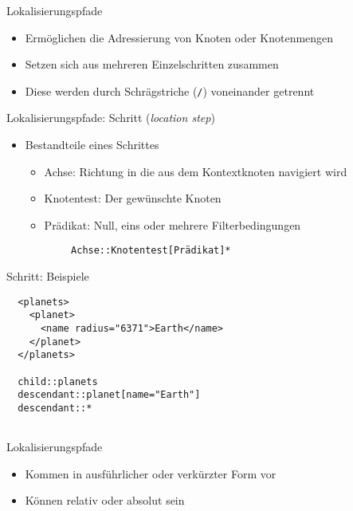 \documentclass{beamer}
\begin{document}
\begin{frame}{Lokalisierungspfade}
	
	\begin{itemize}
		\item Ermöglichen die Adressierung von Knoten oder Knotenmengen	
		\item Setzen sich aus mehreren Einzelschritten zusammen
		\item Diese werden durch Schrägstriche (\texttt{/}) voneinander getrennt
	\end{itemize}
	
\end{frame}

\begin{frame}[fragile]{Lokalisierungspfade: Schritt (\emph{location step})}
	
	\begin{itemize}
		\item Bestandteile eines Schrittes
		\begin{itemize}
			\item Achse: Richtung in die aus dem Kontextknoten navigiert wird
			\item Knotentest: Der gewünschte Knoten
			\item Prädikat: Null, eins oder mehrere Filterbedingungen
		\end{itemize}
		
		\vspace{1cm}
		\centering
		\begin{verbatim}
        Achse::Knotentest[Prädikat]*
		\end{verbatim}
	\end{itemize}
	
\end{frame}

\begin{frame}[fragile]{Schritt: Beispiele}
	
	\lstset{language=XML}
	\begin{lstlisting}	
  <planets>
    <planet>
      <name radius="6371">Earth</name>
    </planet>
  </planets>
	
  child::planets
  descendant::planet[name="Earth"]
  descendant::*
	
	\end{lstlisting}
	
\end{frame}

\begin{frame}{Lokalisierungspfade}
	
	\begin{itemize}
		\item Kommen in ausführlicher oder verkürzter Form vor 
		\item Können relativ oder absolut sein
	\end{itemize}
	
\end{frame}
\end{document}
